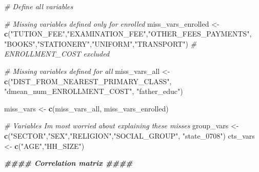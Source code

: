 \documentclass[
]{article}
\newenvironment{Shaded}{\begin{snugshade}}{\end{snugshade}}
\newcommand{\CommentTok}[1]{\textcolor[rgb]{0.56,0.35,0.01}{\textit{#1}}}
\newcommand{\DocumentationTok}[1]{\textcolor[rgb]{0.56,0.35,0.01}{\textbf{\textit{#1}}}}
\newcommand{\FunctionTok}[1]{\textcolor[rgb]{0.13,0.29,0.53}{\textbf{#1}}}
\newcommand{\NormalTok}[1]{#1}
\newcommand{\OtherTok}[1]{\textcolor[rgb]{0.56,0.35,0.01}{#1}}
\newcommand{\StringTok}[1]{\textcolor[rgb]{0.31,0.60,0.02}{#1}}
\begin{document}
\begin{Shaded}
\begin{Highlighting}[]
\CommentTok{\# Define all variables}

\CommentTok{\# Missing variables defined only for enrolled}
\NormalTok{miss\_vars\_enrolled }\OtherTok{\textless{}{-}} \FunctionTok{c}\NormalTok{(}\StringTok{"TUTION\_FEE"}\NormalTok{,}\StringTok{"EXAMINATION\_FEE"}\NormalTok{,}\StringTok{"OTHER\_FEES\_PAYMENTS"}\NormalTok{, }\StringTok{"BOOKS"}\NormalTok{,}\StringTok{"STATIONERY"}\NormalTok{,}\StringTok{"UNIFORM"}\NormalTok{,}\StringTok{"TRANSPORT"}\NormalTok{) }\CommentTok{\# ENROLLMENT\_COST excluded}

\CommentTok{\# Missing variables defined for all}
\NormalTok{miss\_vars\_all }\OtherTok{\textless{}{-}} \FunctionTok{c}\NormalTok{(}\StringTok{"DIST\_FROM\_NEAREST\_PRIMARY\_CLASS"}\NormalTok{,}
                  \StringTok{"dmean\_num\_ENROLLMENT\_COST"}\NormalTok{,}
                  \StringTok{"father\_educ"}\NormalTok{)}

\NormalTok{miss\_vars }\OtherTok{\textless{}{-}} \FunctionTok{c}\NormalTok{(miss\_vars\_all, miss\_vars\_enrolled)}

\CommentTok{\# Variables I\textquotesingle{}m most worried about explaining these misses}
\NormalTok{group\_vars }\OtherTok{\textless{}{-}} \FunctionTok{c}\NormalTok{(}\StringTok{"SECTOR"}\NormalTok{,}\StringTok{"SEX"}\NormalTok{,}\StringTok{"RELIGION"}\NormalTok{,}\StringTok{"SOCIAL\_GROUP"}\NormalTok{, }\StringTok{"state\_0708"}\NormalTok{)}
\NormalTok{cts\_vars }\OtherTok{\textless{}{-}} \FunctionTok{c}\NormalTok{(}\StringTok{"AGE"}\NormalTok{,}\StringTok{"HH\_SIZE"}\NormalTok{)}




\DocumentationTok{\#\#\#\# Correlation matrix \#\#\#\#}


\end{Highlighting}
\end{Shaded}
\end{document}
